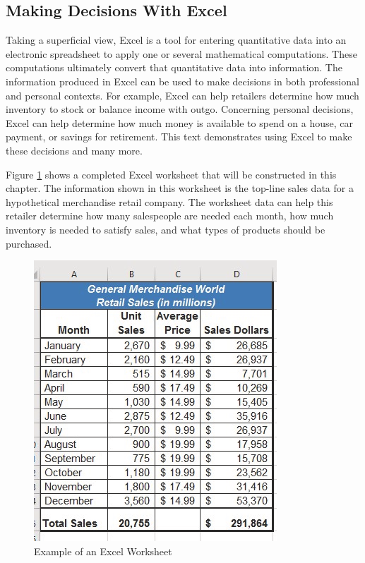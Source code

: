 \subsection{Making Decisions With Excel}

Taking a superficial view, Excel is a tool for entering quantitative data into an electronic spreadsheet to apply one or several mathematical computations. These computations ultimately convert that quantitative data into information. The information produced in Excel can be used to make decisions in both professional and personal contexts. For example, Excel can help retailers determine how much inventory to stock or balance income with outgo. Concerning personal decisions, Excel can help determine how much money is available to spend on a house, car payment, or savings for retirement. This text demonstrates using Excel to make these decisions and many more.

Figure \ref{01:fig01} shows a completed Excel worksheet that will be constructed in this chapter. The information shown in this worksheet is the top-line sales data for a hypothetical merchandise retail company. The worksheet data can help this retailer determine how many salespeople are needed each month, how much inventory is needed to satisfy sales, and what types of products should be purchased.

\begin{figure}[H]
	\centering
	\includegraphics[width=\maxwidth{.95\linewidth}]{gfx/ch01_fig01}
	\caption{Example of an Excel Worksheet}
	\label{01:fig01}
\end{figure}

